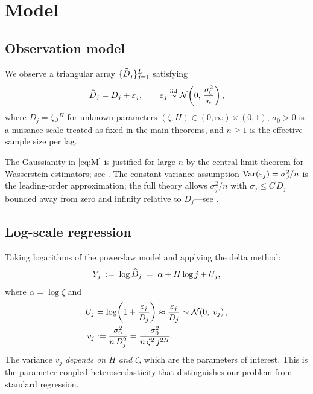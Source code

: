 \section{Model}
\label{sec:model}

\subsection{Observation model}

We observe a triangular array $\{\widehat{D}_j\}_{j=1}^{L}$ satisfying
\begin{equation}
    \widehat{D}_j = D_j + \varepsilon_j,\qquad
    \varepsilon_j \overset{\text{iid}}{\sim} \mathcal{N}\!\left(0,\,\frac{\sigma_0^2}{n}\right),
    \label{eq:M}
\end{equation}
where $D_j = \zeta\,j^H$ for unknown parameters $(\zeta, H) \in
(0,\infty)\times(0,1)$, $\sigma_0 > 0$ is a nuisance scale treated as fixed
in the main theorems, and $n \geq 1$ is the effective sample size per lag.

\begin{remark}
    The Gaussianity in \eqref{eq:M} is justified for large $n$ by the
    central limit theorem for Wasserstein estimators; see
    \citet{fournier2015rate,goldfeld2024limit,delbarrio2023improved,weed2019sharp}.  The
    constant-variance assumption $\mathrm{Var}(\varepsilon_j) = \sigma_0^2/n$ is
    the leading-order approximation; the full theory allows $\sigma_j^2/n$
    with $\sigma_j \leq C\,D_j$ bounded away from zero and infinity
    relative to $D_j$---see .
\end{remark}

\subsection{Log-scale regression}

Taking logarithms of the power-law model and applying the delta method:
\begin{equation}
    Y_j \;:=\; \log \widehat{D}_j \;=\; \alpha + H \log j + U_j,
    \label{eq:log-model}
\end{equation}
where $\alpha = \log \zeta$ and
\begin{align}
    U_j &= \log\!\left(1 + \frac{\varepsilon_j}{D_j}\right)
         \approx \frac{\varepsilon_j}{D_j}
         \sim \mathcal{N}\!\left(0,\; v_j\right), \label{eq:log-noise}\\
    v_j &:= \frac{\sigma_0^2}{n\,D_j^2}
         = \frac{\sigma_0^2}{n\,\zeta^2\,j^{2H}}.
\end{align}
The variance $v_j$ \emph{depends on $H$ and $\zeta$}, which are the
parameters of interest.  This is the parameter-coupled heteroscedasticity
that distinguishes our problem from standard regression.

